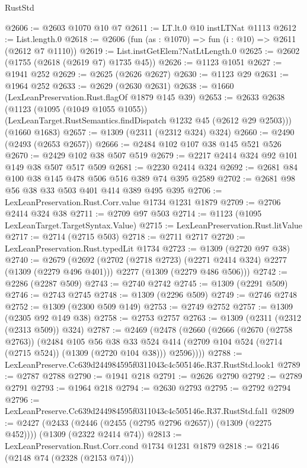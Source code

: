 \begin{lexlean}{RustStd}
\begin{coremodule}
@2606 := @2603 @1070 @10 @7
@2611 := LT.lt.{0} @10 instLTNat @1113
@2612 := List.length.{0}
@2618 := @2606 (fun (as : @1070) => fun (i : @10) => @2611 (@2612 @7 @1110))
@2619 := List.instGetElem?NatLtLength.{0}
@2625 := @2602 (@1755 (@2618 (@2619 @7) @1735 @45))
@2626 := @1123 @1051
@2627 := @1941 @252
@2629 := @2625 (@2626 @2627)
@2630 := @1123 @29
@2631 := @1964 @252
@2633 := @2629 (@2630 @2631)
@2638 := @1660 (LexLeanPreservation.Rust.flagOf @1879 @145 @39)
@2653 := @2633
    @2638
    (@1123
      (@1095 (@1049 @1055 @1055))
      (LexLeanTarget.RustSemantics.findDispatch @1232 @45 (@2612 @29 @2503)))
    (@1660 @1683)
@2657 := @1309 (@2311 (@2312 @324) @324)
@2660 := @2490 (@2493 (@2653 @2657))
@2666 := @2484 @102 @107 @38 @145 @521 @526
@2670 := @2429 @102 @38 @507 @519
@2679 := @2217 @2414 @324 @92 @101 @149 @38 @507 @517 @509
@2681 := @2230 @2414 @324
@2692 := @2681 @84 @100 @38 @145 @478 @506 @516 @389 @74 @395 @2589
@2702 := @2681 @98 @56 @38 @33 @503 @401 @414 @389 @495 @395
@2706 := LexLeanPreservation.Rust.Corr.value @1734 @1231 @1879
@2709 := @2706 @2414 @324 @38
@2711 := @2709 @97 @503
@2714 := @1123 (@1095 LexLeanTarget.TargetSyntax.Value)
@2715 := LexLeanPreservation.Rust.litValue
@2717 := @2714 (@2715 @503)
@2718 := @2711 @2717
@2720 := LexLeanPreservation.Rust.typedLit @1734
@2723 := @1309 (@2720 @97 @38)
@2740 := @2679
    (@2692
      (@2702 (@2718 @2723) (@2271 @2414 @324) @2277 (@1309 (@2279 @496 @401)))
      @2277
      (@1309 (@2279 @486 @506)))
@2742 := @2286 (@2287 @509)
@2743 := @2740 @2742
@2745 := @1309 (@2291 @509)
@2746 := @2743 @2745
@2748 := @1309 (@2296 @509)
@2749 := @2746 @2748
@2752 := @1309 (@2300 @509 @149)
@2753 := @2749 @2752
@2757 := @1309 (@2305 @92 @149 @38)
@2758 := @2753 @2757
@2763 := @1309 (@2311 (@2312 (@2313 @509)) @324)
@2787 := @2469
    (@2478
      (@2660
        (@2666
          (@2670 (@2758 @2763))
          (@2484
            @105
            @56
            @38
            @33
            @524
            @414
            (@2709 @104 @524 (@2714 (@2715 @524)) (@1309 (@2720 @104 @38)))
            @2596))))
@2788 := LexLeanPreserve.Cc639d244984595f0311043c4c505146e.R37.RustStd.look1
@2789 := @2787 @2788
@2790 := @1941 @218
@2791 := @2626 @2790
@2792 := @2789 @2791
@2793 := @1964 @218
@2794 := @2630 @2793
@2795 := @2792 @2794
@2796 := LexLeanPreserve.Cc639d244984595f0311043c4c505146e.R37.RustStd.fal1
@2809 := @2427
    (@2433 (@2446 (@2455 (@2795 @2796 @2657)) (@1309 (@2275 @452))))
    (@1309 (@2322 @2414 @74))
@2813 := LexLeanPreservation.Rust.Corr.cond @1734 @1231 @1879
@2818 := @2146 (@2148 @74 (@2328 (@2153 @74)))

\end{coremodule}
\end{lexlean}
